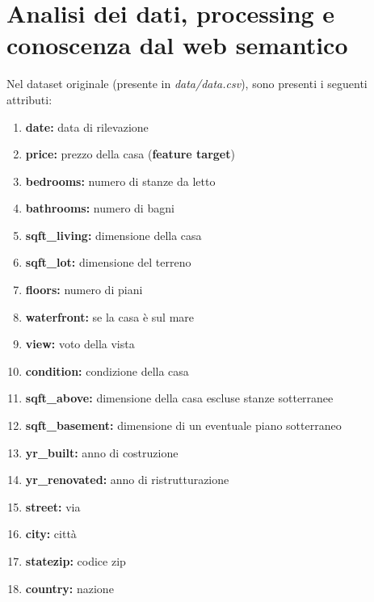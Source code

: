 \documentclass{article}
\begin{document}
\section{Analisi dei dati, processing e conoscenza dal web semantico}
Nel dataset originale (presente in \textit{data/data.csv}), sono presenti i
seguenti attributi:
\begin{enumerate}
	\itemsep0em
	\item \textbf{date:} data di rilevazione
	\item \textbf{price:} prezzo della casa (\textbf{feature target})
	\item \textbf{bedrooms:} numero di stanze da letto
	\item \textbf{bathrooms:} numero di bagni
	\item \textbf{sqft\_living:} dimensione della casa
	\item \textbf{sqft\_lot:} dimensione del terreno
	\item \textbf{floors:} numero di piani
	\item \textbf{waterfront:} se la casa è sul mare
	\item \textbf{view:} voto della vista
	\item \textbf{condition:} condizione della casa
	\item \textbf{sqft\_above:} dimensione della casa escluse stanze sotterranee
	\item \textbf{sqft\_basement:} dimensione di un eventuale piano sotterraneo
	\item \textbf{yr\_built:} anno di costruzione
	\item \textbf{yr\_renovated:} anno di ristrutturazione
	\item \textbf{street:} via
	\item \textbf{city:} città
	\item \textbf{statezip:} codice zip
	\item \textbf{country:} nazione
\end{enumerate}
\end{document}
